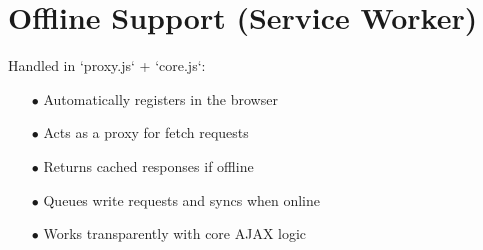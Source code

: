 \documentclass[a4paper]{article}
\begin{document}
\hypertarget{toc20}{}
\section{Offline Support (Service Worker)}

Handled in `proxy.js` + `core.js`:

\begin{itemize}
\item[\color{myblue}$\bullet$] Automatically registers in the browser
\item[\color{myblue}$\bullet$] Acts as a proxy for fetch requests
\item[\color{myblue}$\bullet$] Returns cached responses if offline
\item[\color{myblue}$\bullet$] Queues write requests and syncs when online
\item[\color{myblue}$\bullet$] Works transparently with core AJAX logic

\end{itemize}

\end{document}

